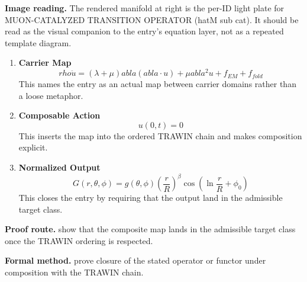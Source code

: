 \begin{samepage}
\noindent\begin{minipage}[t]{0.45\linewidth}
\vspace{0pt}
\raggedright
\scriptsize\textbf{Image reading.} The rendered manifold at right is the per-ID light plate for MUON-CATALYZED TRANSITION OPERATOR (hatM sub cat). It should be read as the visual companion to the entry's equation layer, not as a repeated template diagram.\par
\end{minipage}\hfill
\begin{minipage}[t]{0.53\linewidth}
\vspace*{-0.10in}
\raggedright
{}
\end{minipage}
\end{samepage}

\clearpage


\begin{enumerate}[leftmargin=1.6em,itemsep=9pt,topsep=6pt]
\item \textbf{Carrier Map}
\[
rho \ddot{u} = (\lambda + \mu)  abla( abla \cdot u) + \mu  abla^2 u + f_{EM} + f_{fold}
\]
This names the entry as an actual map between carrier domains rather than a loose metaphor.

\item \textbf{Composable Action}
\[
u(0,t) = 0
\]
This inserts the map into the ordered TRAWIN chain and makes composition explicit.

\item \textbf{Normalized Output}
\[
G(r, \theta, \phi) = g(\theta, \phi) \left(\frac{r}{R}\right)^\beta \cos(\ln \frac{r}{R} + \phi_0)
\]
This closes the entry by requiring that the output land in the admissible target class.
\end{enumerate}

\textbf{Proof route.} show that the composite map lands in the admissible target class once the TRAWIN ordering is respected.

\textbf{Formal method.} prove closure of the stated operator or functor under composition with the TRAWIN chain.

\medskip
{}


